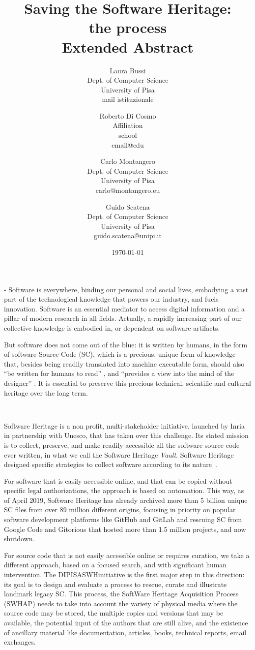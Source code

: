 \documentclass[a4paper]{article}
\title{Saving the Software Heritage:
				\\ the process  
				\\ 	\large Extended Abstract
}
\author{
    Laura Bussi\\
    Dept. of Computer Science\\
    University of Pisa\\
    mail istituzionale
	\and
    Roberto Di Cosmo\\
    Affiliation\\
    school\\
    email@edu
  \and
    Carlo Montangero\\
    Dept. of Computer Science\\
    University of Pisa\\
    carlo@montangero.eu
  \and
    Guido Scatena\\
		Dept. of Computer Science\\
    University of Pisa\\
    guido.scatena@unipi.it
}
\date{\today}
\newcommand{\DIPISASWHinitiative}{DIPISASWHinitiative }
\begin{document}
\maketitle

 - Software is everywhere,  binding our personal and social lives, embodying a vast part of the technological knowledge that powers our industry, and fuels innovation. Software is an essential mediator to access digital information and a pillar of modern research in all fields. Actually, a rapidly increasing part of our collective knowledge is embodied in, or dependent on software artifacts. 

But software does not come out of the blue: it is written by humans, in the form of software Source Code (SC), which is a precious, unique form of knowledge that, besides being readily translated into machine executable form, should also "`be written for humans to read"' \cite{AbelsonS85}, and "`provides a view into the mind of the designer"' \cite{Shustek06}. It is essential to preserve this precious technical, scientific and cultural heritage over the long term.

\

\noindent
Software Heritage is a non profit, multi-stakeholder initiative, launched by Inria in partnership with Unesco, that has taken over this challenge. Its stated mission is to collect, preserve, and make readily accessible all the software source code ever written, in what we call the Software Heritage \emph{Vault}. Software Heritage designed specific strategies to collect software according to its nature~\cite{CACM2018}. 

For software that is easily accessible online, and that can be copied without specific legal authorizations, the approach is based on automation. This way, as of April 2019, Software Heritage has already archived more than 5 billion unique SC files from over 89 million different origins, focusing in priority on popular software development platforms like GitHub and GitLab and rescuing SC from Google Code and Gitorious that hosted more than 1.5 million projects, and now shutdown.

For source code that is not easily accessible online or requires curation, we take a different approach, based on a focused search, and with significant human intervention. The \DIPISASWHinitiative is the first major step in this direction: its goal is to design and evaluate a process to rescue, curate and illustrate landmark legacy SC. This process, the SoftWare Heritage Acquisition Process (SWHAP) needs to take into account the variety of physical media where the source code may be stored, the multiple copies and versions that may be available, the potential input of the authors that are still alive, and the existence of ancillary material like documentation, articles, books, technical reports, email exchanges.
\end{document}
